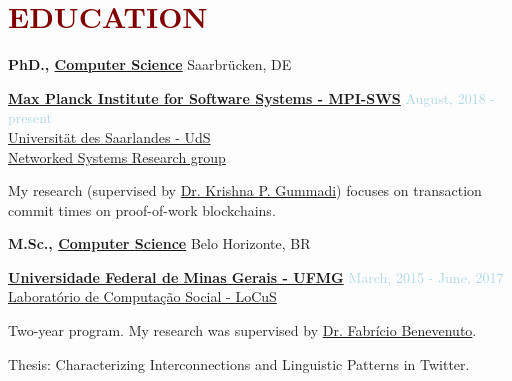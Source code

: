\section*{\textcolor{maroon}{\normalsize EDUCATION}} 

\textbf{PhD., \href{https://www.mpi-sws.org}{Computer Science}}  \hfill {Saarbrücken, DE}
\begin{outerlist}

\item[] \href{https://www.mpi-sws.org}{\textbf{Max Planck Institute for Software Systems - MPI-SWS}} \hfill {\textcolor{lightblue}{August, 2018 - present}}
\\ \href{https://www.uni-saarland.de/nc/en/home.html}{Universität des Saarlandes - UdS}
\\ \href{https://www.mpi-sws.org/research-areas/social-and-information-systems/}{Networked Systems Research group}  \medskip

        \begin{innerlist}[-]
                \item My research (supervised by \href{https://people.mpi-sws.org/~gummadi/}{Dr. Krishna P. Gummadi}) focuses on transaction commit times on proof-of-work blockchains.
        \end{innerlist}

\end{outerlist}

\medskip


\textbf{M.Sc., 
        \href{https://ufmg.br/}
             {Computer Science}} \hfill {Belo Horizonte, BR}
\begin{outerlist}

\item[] \href{https://ufmg.br/}{\textbf{Universidade Federal de Minas Gerais - UFMG}}  \hfill {\textcolor{lightblue}{March, 2015 - June, 2017}}
\\ \href{https://www.dcc.ufmg.br/dcc/?q=pt-br/node/2728}{Laboratório de Computação Social - LoCuS}  \medskip 

        \begin{innerlist}[-]
        \item Two-year program. My research was supervised by \href{https://homepages.dcc.ufmg.br/~fabricio/}{Dr. Fabrício Benevenuto}.
        \item Thesis: Characterizing Interconnections and Linguistic Patterns in Twitter.        
        \end{innerlist}

\end{outerlist}

